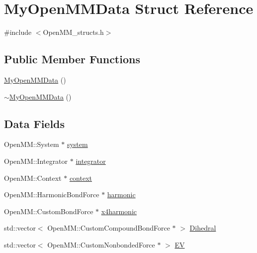 \hypertarget{structMyOpenMMData}{}\section{My\+Open\+M\+M\+Data Struct Reference}
\label{structMyOpenMMData}


{\ttfamily \#include $<$Open\+M\+M\+\_\+structs.\+h$>$}

\subsection*{Public Member Functions}
\begin{DoxyCompactItemize}
\item 
\mbox{\hyperlink{structMyOpenMMData_ad91ea098216e5bbee8f0199d2a7e2c7d}{My\+Open\+M\+M\+Data}} ()
\item 
\mbox{\hyperlink{structMyOpenMMData_a8b18e9a40611765e2c966495e2a339bb}{$\sim$\+My\+Open\+M\+M\+Data}} ()
\end{DoxyCompactItemize}
\subsection*{Data Fields}
\begin{DoxyCompactItemize}
\item 
Open\+M\+M\+::\+System $\ast$ \mbox{\hyperlink{structMyOpenMMData_ad14c08e4c616766db92ae52e57b44480}{system}}
\item 
Open\+M\+M\+::\+Integrator $\ast$ \mbox{\hyperlink{structMyOpenMMData_a471489f3c9bd1e5a54fc5202b71b6b96}{integrator}}
\item 
Open\+M\+M\+::\+Context $\ast$ \mbox{\hyperlink{structMyOpenMMData_a2d94acedaa245a3fb2faa48625fa7fc1}{context}}
\item 
Open\+M\+M\+::\+Harmonic\+Bond\+Force $\ast$ \mbox{\hyperlink{structMyOpenMMData_af2fef800bec4dda8e074aa6167624a2f}{harmonic}}
\item 
Open\+M\+M\+::\+Custom\+Bond\+Force $\ast$ \mbox{\hyperlink{structMyOpenMMData_ac7bcf8c5273a640f7f606bda799fba37}{x4harmonic}}
\item 
std\+::vector$<$ Open\+M\+M\+::\+Custom\+Compound\+Bond\+Force $\ast$ $>$ \mbox{\hyperlink{structMyOpenMMData_af6d21883ce573f7555a5161514eb9fbf}{Dihedral}}
\item 
std\+::vector$<$ Open\+M\+M\+::\+Custom\+Nonbonded\+Force $\ast$ $>$ \mbox{\hyperlink{structMyOpenMMData_a5284fe93e3178234282fdbad2d80c07e}{EV}}
\end{DoxyCompactItemize}


